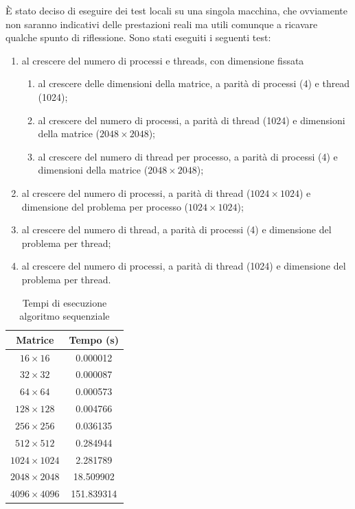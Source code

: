 È stato deciso di eseguire dei test locali su una singola macchina, che ovviamente non saranno indicativi delle prestazioni reali ma utili comunque a ricavare qualche spunto di riflessione.
Sono stati eseguiti i seguenti test:
\begin{enumerate}
    \item al crescere del numero di processi e threads, con dimensione fissata
          \begin{enumerate}
              \item al crescere delle dimensioni della matrice, a parità di processi (4) e thread (1024);
              \item al crescere del numero di processi, a parità di thread (1024) e dimensioni della matrice ($2048 \times 2048$);
              \item al crescere del numero di thread per processo, a parità di processi (4) e dimensioni della matrice ($2048 \times 2048$);
          \end{enumerate}
    \item al crescere del numero di processi, a parità di thread ($1024 \times 1024$) e dimensione del problema per processo ($1024 \times 1024$);
    \item al crescere del numero di thread, a parità di processi (4) e dimensione del problema per thread;
    \item al crescere del numero di processi, a parità di thread (1024) e dimensione del problema per thread.
\end{enumerate}

\begin{table}[h]
    \centering
    \begin{tabular}{cc}
        \hline
        \textbf{Matrice}    & \textbf{Tempo (s)} \\ \hline
        $16   \times 16   $ & 0.000012           \\
        $32   \times 32   $ & 0.000087           \\
        $64   \times 64   $ & 0.000573           \\
        $128  \times 128  $ & 0.004766           \\
        $256  \times 256  $ & 0.036135           \\
        $512  \times 512  $ & 0.284944           \\
        $1024 \times 1024 $ & 2.281789           \\
        $2048 \times 2048 $ & 18.509902          \\
        $4096 \times 4096 $ & 151.839314         \\ \hline
    \end{tabular}
    \caption{Tempi di esecuzione algoritmo sequenziale}
\end{table}


